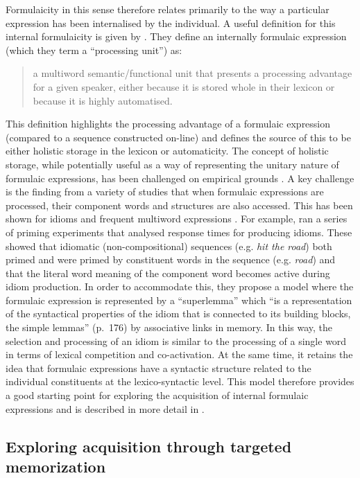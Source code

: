 \documentclass[output=paper]{langscibook}
\begin{document}
Formulaicity in this sense therefore relates primarily to the way a particular expression has been internalised by the individual. A useful definition for this internal formulaicity is given by \citet{MylesCordier2017}. They define an internally formulaic expression (which they term a ``processing unit'') as: 

\begin{quote}
a multiword semantic/functional unit that presents a processing advantage for a given speaker, either because it is stored whole in their lexicon or because it is highly automatised.
\end{quote}

This definition highlights the processing advantage of a formulaic expression (compared to a sequence constructed on-line) and defines the source of this to be either holistic storage in the lexicon or automaticity. The concept of holistic storage, while potentially useful as a way of representing the unitary nature of formulaic expressions, has been challenged on empirical grounds \citep{Siyanova-Chanturia2015}.  A key challenge is the finding from a variety of studies that when formulaic expressions are processed, their component words and structures are also accessed. This has been shown for idioms \citep{SprengerEtAl2006} and frequent multiword expressions \citep{ArnonPriva2014}. For example, \citet{SprengerEtAl2006} ran a series of priming experiments that analysed response times for producing idioms. These showed that idiomatic (non-compositional) sequences (e.g. \textit{hit the road}) both primed and were primed by constituent words in the sequence (e.g. \textit{road}) and that the literal word meaning of the component word becomes active during idiom production. In order to accommodate this, they propose a model where the formulaic expression is represented by a ``superlemma'' which “is a representation of the syntactical properties of the idiom that is connected to its building blocks, the simple lemmas” (p.~176) by associative links in memory. In this way, the selection and processing of an idiom is similar to the processing of a single word in terms of lexical competition and co-activation. At the same time, it retains the idea that formulaic expressions have a syntactic structure related to the individual constituents at the lexico-syntactic level. This model therefore provides a good starting point for exploring the acquisition of internal formulaic expressions and is described in more detail in .

\subsection{Exploring acquisition through targeted memorization}\label{sec:cutler:1.3}
\end{document}
